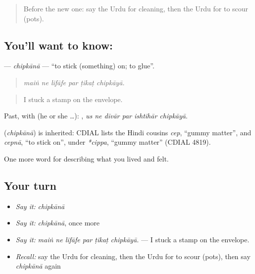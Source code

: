 \label{lesson:UR-C506-chipkana}



\begin{quote}
Before the new one: say the Urdu for cleaning, then the Urdu for to scour (pots).
\end{quote}

\subsection*{You'll want to know: }
\textbf{} — \emph{chipkānā} — \textquotedblleft{}to stick (something) on; to glue\textquotedblright{}.

\begin{quote}
     
\end{quote}

\begin{quote}
\emph{maiṅ ne lifāfe par ṭikaṭ chipkāyā.}
\end{quote}

\begin{quote}
I stuck a stamp on the envelope.
\end{quote}

Past, with  (he or she …):      , \emph{us ne dīvār par ishtihār chipkāyā}.

\begin{cousinweb}
\textbf{} (\emph{chipkānā}) is inherited: CDIAL lists the Hindi cousins \emph{cep}, \textquotedblleft{}gummy matter\textquotedblright{}, and \emph{cepnā}, \textquotedblleft{}to stick on\textquotedblright{}, under \emph{*cippa}, \textquotedblleft{}gummy matter\textquotedblright{} (CDIAL 4819).
\end{cousinweb}

\begin{grammarlens}[title={What you've built}]
One more word for describing what you lived and felt.
\end{grammarlens}

\subsection*{Your turn}
\begin{itemize}
\raggedright
  \item \emph{Say it:} \emph{chipkānā}
  \item \emph{Say it:} \emph{chipkānā}, once more
  \item \emph{Say it:} \emph{maiṅ ne lifāfe par ṭikaṭ chipkāyā.} — I stuck a stamp on the envelope.
  \item \emph{Recall:} say the Urdu for cleaning, then the Urdu for to scour (pots), then say \emph{chipkānā} again
\end{itemize}

